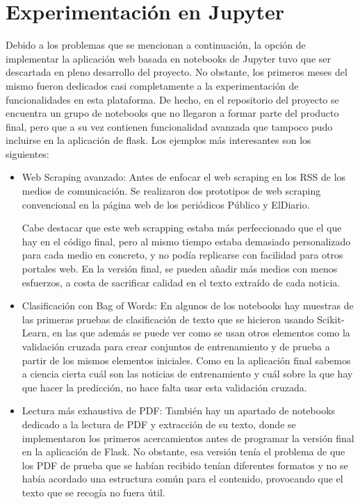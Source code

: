 \section{Experimentación en Jupyter}

Debido a los problemas que se mencionan a continuación, la opción de implementar la aplicación web basada en notebooks de Jupyter tuvo que ser descartada en pleno desarrollo del proyecto.
No obstante, los primeros meses del mismo fueron dedicados casi completamente a la experimentación de funcionalidades en esta plataforma. De hecho, en el repositorio del proyecto se encuentra un grupo de notebooks que no llegaron a formar parte del producto final, pero que a su vez contienen funcionalidad avanzada que tampoco pudo incluirse en la aplicación de flask. Los ejemplos más interesantes son los siguientes:

\begin{itemize}

\item Web Scraping avanzado: Antes de enfocar el web scraping en los RSS de los medios de comunicación. Se realizaron dos prototipos de web scraping convencional en la página web de los periódicos Público y ElDiario.

Cabe destacar que este web scrapping estaba más perfeccionado que el que hay en el código final, pero al mismo tiempo estaba demasiado personalizado para cada medio en concreto, y no podía replicarse con facilidad para otros portales web. En la versión final, se pueden añadir más medios con menos esfuerzos, a costa de sacrificar calidad en el texto extraído de cada noticia.

\item Clasificación con Bag of Words: En algunos de los notebooks hay muestras de las primeras pruebas de clasificación de texto que se hicieron usando Scikit-Learn, en las que además se puede ver como se usan otros elementos como la validación cruzada para crear conjuntos de entrenamiento y de prueba a partir de los mismos elementos iniciales. Como en la aplicación final sabemos a ciencia cierta cuál son las noticias de entrenamiento y cuál sobre la que hay que hacer la predicción, no hace falta usar esta validación cruzada.

\item Lectura más exhaustiva de PDF: También hay un apartado de notebooks dedicado a la lectura de PDF y extracción de su texto, donde se implementaron los primeros acercamientos antes de programar la versión final en la aplicación de Flask. No obstante, esa versión tenía el problema de que los PDF de prueba que se habían recibido tenían diferentes formatos y no se había acordado una estructura común para el contenido, provocando que el texto que se recogía no fuera útil.

\end{itemize}

